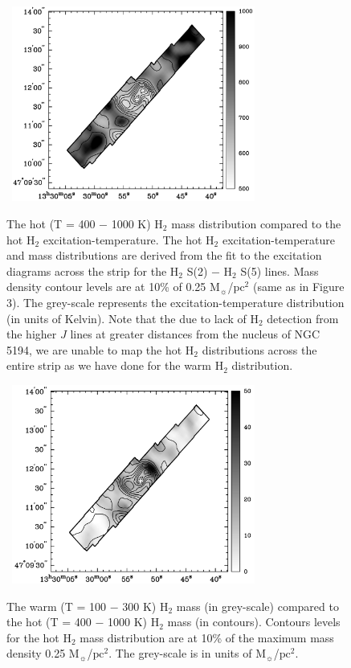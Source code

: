 \documentclass[manuscript]{aastex}
\begin{document}
\clearpage
\begin{figure}[!h]
\centerline{\hbox{\hspace{0.0in}
\includegraphics[width=8cm,angle=0]{bw_hot_h2.jpg}}}
\caption{The hot (T = 400 $-$ 1000 K) $\mathrm{H_2}$ mass distribution compared to the hot $\mathrm{H_2}$ excitation-temperature.  The hot $\mathrm{H_2}$ excitation-temperature and mass distributions are derived from the fit to the excitation diagrams across the strip for the $\mathrm{H_2}$ S(2) $-$ $\mathrm{H_2}$ S(5) lines.  Mass density contour levels are at 10\% of 0.25 $\mathrm{M_\sun}$/$\mathrm{pc^2}$ (same as in Figure 3). 
The grey-scale represents the excitation-temperature distribution (in units of Kelvin).  Note that the due to lack of $\mathrm{H_2}$ detection from the higher $J$ lines at greater distances from the nucleus of NGC 5194, we are unable to map the hot $\mathrm{H_2}$ distributions across the entire strip as we have done for the warm $\mathrm{H_2}$ distribution.\label{fig5}}
\end{figure}

\clearpage
\begin{figure}[!h]
\centerline{\hbox{\hspace{0.0in}
\includegraphics[width=8cm,angle=0]{bw_warm_v_hot.jpg}}}
\caption{The warm (T = 100 $-$ 300 K) $\mathrm{H_2}$ mass (in grey-scale) compared to the hot (T = 400 $-$ 1000 K) $\mathrm{H_2}$ mass (in contours).  Contours levels for the hot $\mathrm{H_2}$ mass distribution are at 10\% of the maximum mass density 0.25 $\mathrm{M_\sun}$/$\mathrm{pc^2}$. 
The grey-scale is in units of $\mathrm{M_\sun}$/$\mathrm{pc^2}$.
\label{fig6}}
\end{figure}
\end{document}
